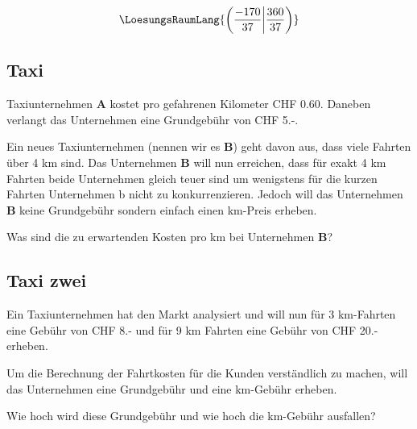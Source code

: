 \vspace{15mm}

$$\LoesungsRaumLang{\left( \frac{-170}{37} \middle| \frac{360}{37} \right)}$$

\subsection{Taxi}
Taxiunternehmen \textbf{A} kostet pro gefahrenen Kilometer CHF
0.60. Daneben verlangt das Unternehmen eine Grundgebühr von CHF 5.-.

Ein neues Taxiunternehmen (nennen wir es \textbf{B}) geht davon aus, dass viele Fahrten über 4 km
sind. Das Unternehmen \textbf{B} will nun erreichen, dass für exakt 4
km Fahrten beide Unternehmen gleich teuer sind um wenigstens für die
kurzen Fahrten Unternehmen b nicht zu konkurrenzieren. Jedoch will das
Unternehmen \textbf{B} keine Grundgebühr sondern einfach einen
km-Preis erheben.

Was sind die zu erwartenden Kosten pro km bei Unternehmen \textbf{B}?

\subsection{Taxi zwei}
Ein Taxiunternehmen hat den Markt analysiert und will nun für 3
km-Fahrten  eine Gebühr von CHF 8.- und für 9 km Fahrten eine Gebühr
von CHF 20.- erheben.

Um die Berechnung der Fahrtkosten für die Kunden verständlich zu
machen, will das Unternehmen eine Grundgebühr und eine km-Gebühr
erheben.

Wie hoch wird diese Grundgebühr und wie hoch die km-Gebühr ausfallen?



